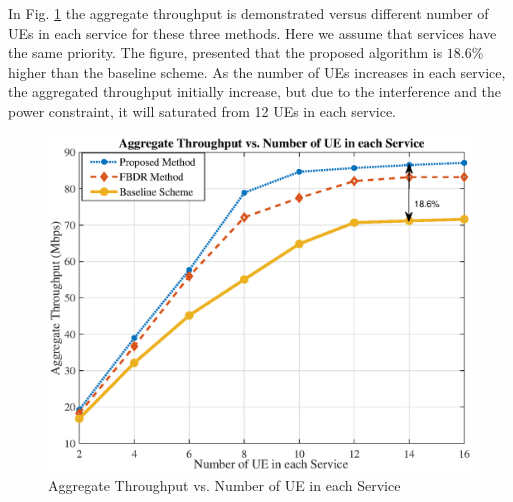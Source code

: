 \documentclass[conference]{IEEEtran}
\begin{document}
In Fig. \ref{fig:1} the aggregate throughput is demonstrated versus different number of UEs in each service for these three methods. Here we assume that services have the same priority. The figure, presented that the proposed algorithm is $18.6\%$ higher than the baseline scheme.
As the number of UEs increases in each service, the aggregated throughput initially increase, but due to the interference and the power constraint, it will saturated from 12 UEs in each service.
\begin{figure}
  \centering 
    \includegraphics[scale = 0.4]{rate_ue1.eps}
  \caption{Aggregate Throughput vs. Number of UE in each Service }
  \label{fig:1}
\end{figure}
\end{document}
